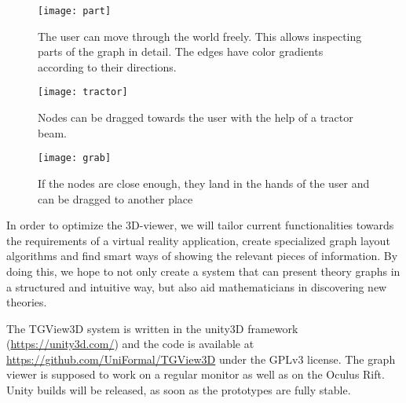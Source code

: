 \documentclass{llncs}
\begin{document}
\begin{figure}
    \centering
    \texttt{[image: part]}
    \caption{The user can move through the world freely. This allows inspecting parts of the graph in detail. The edges have color gradients according to their directions.}
    \label{fig:sample_figure2}
\end{figure}


\begin{figure}
    \centering
    \texttt{[image: tractor]}
    \caption{Nodes can be dragged towards the user with the help of a tractor beam.}
    \label{fig:sample_figure3}
\end{figure}

\begin{figure}\centering
    \texttt{[image: grab]}
    \caption{If the nodes are close enough, they land in the hands of the user and can be dragged to another place}
    \label{fig:sample_figure4}
\end{figure}

In order to optimize the 3D-viewer, we will tailor current functionalities towards the
requirements of a virtual reality application, create specialized graph layout algorithms
and find smart ways of showing the relevant pieces of information. By doing this, we
hope to not only create a system that can present theory graphs in a structured and
intuitive way, but also aid mathematicians in discovering new theories.

The TGView3D system is written in the unity3D framework (\url{https://unity3d.com/}) and the code is available at \url{https://github.com/UniFormal/TGView3D} under the GPLv3 license.
The graph viewer is supposed to work on a regular monitor as well as on the Oculus Rift. Unity builds will be released, as soon as the prototypes are fully stable.

\printbibliography
\end{document}
